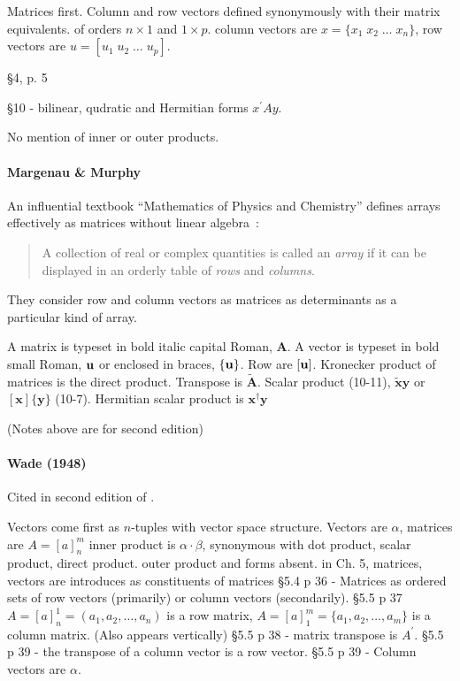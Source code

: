 Matrices first. Column and row vectors defined synonymously with their matrix equivalents.
of orders $n\times1$ and $1\times p$.
column vectors are $x = \{x_1\;x_2\;\dots\;x_n\}$,
row vectors are $u = [u_1\;u_2\;\dots\;u_p]$.

\S 4, p. 5

\S 10 - bilinear, qudratic and Hermitian forms $x^\prime A y$.

No mention of inner or outer products.


\paragraph{Margenau \& Murphy~\cite{Margenau1943}}

An influential textbook ``Mathematics of Physics and Chemistry'' defines arrays
effectively as matrices without linear algebra~\cite[\S 10.1, p. 288]{Margenau1943}:

\begin{quote}
A collection of real or complex quantities is called an
\textit{array} if it can be displayed in an orderly table of \textit{rows} and \textit{columns}.
\end{quote}

They consider row and column vectors as matrices as determinants as a particular kind of array.

A matrix is typeset in bold italic capital Roman, $\boldsymbol A$.
A vector is typeset in bold small Roman, $\textbf u$ or enclosed in braces, $\{ \textbf u \}$.
Row are $[\textbf u ]$.
Kronecker product of matrices is the direct product.
Transpose is $\tilde{\boldsymbol A}$.
Scalar product (10-11), $\tilde{\mathbf x} \mathbf y$ or $[\mathbf x] \{\mathbf y\}$ (10-7).
Hermitian scalar product is $\mathbf x^\dagger \mathbf y$



(Notes above are for second edition)



\paragraph{Wade (1948)~\cite{Wade1948}}

Cited in second edition of \cite{Margenau1943}.

Vectors come first as $n$-tuples with vector space structure.
Vectors are $\alpha$, matrices are $A = [a]^m_n$
inner product is $\alpha \cdot \beta$, synonymous with dot product, scalar product, direct product.
outer product and forms absent.
in Ch. 5, matrices, vectors are introduces as constituents of matrices
\S 5.4 p 36 - Matrices as ordered sets of row vectors (primarily) or column vectors (secondarily).
\S 5.5 p 37 $A = [a]^1_n = (a_1, a_2, \dots, a_n)$ is a row matrix,
$A = [a]^m_1 = \{a_1, a_2, \dots, a_m \}$ is a column matrix. (Also appears vertically)
\S 5.5 p 38 - matrix transpose is $A^\prime$.
\S 5.5 p 39 - the transpose of a column vector is a row vector.
\S 5.5 p 39 - Column vectors are $\alpha$.



